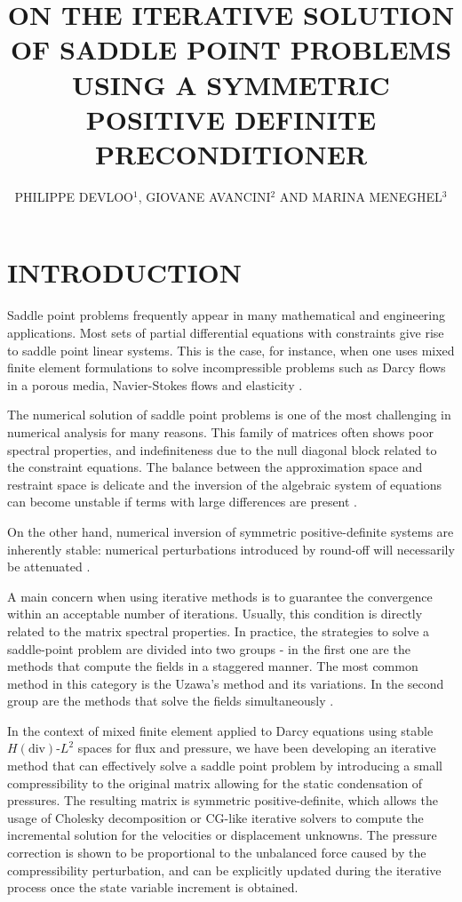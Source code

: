 \documentclass{wccm2024}
\title{ON THE ITERATIVE SOLUTION OF SADDLE POINT PROBLEMS USING A SYMMETRIC POSITIVE DEFINITE PRECONDITIONER}
\author{PHILIPPE DEVLOO$^{1}$, GIOVANE AVANCINI$^{2}$ AND MARINA MENEGHEL$^{3}$}
\begin{document}
\thispagestyle{empty}

\section{INTRODUCTION}

Saddle point problems frequently appear in many mathematical and engineering applications. Most sets of partial differential equations with constraints give rise to saddle point linear systems. This is the case, for instance, when one uses mixed finite element formulations to solve incompressible problems such as Darcy flows in a porous media, Navier-Stokes flows and elasticity \cite{brezzi2012mixed,duran2019multiscale,brink1996some}.

The numerical solution of saddle point problems is one of the most challenging in numerical analysis for many reasons. This family of matrices often shows poor spectral properties, and indefiniteness due to the null diagonal block related to the constraint equations. The balance between the approximation space and restraint space is delicate and the inversion of the algebraic system of equations can become unstable if terms with large differences are present \cite{bank1989class}. 

On the other hand, numerical inversion of symmetric positive-definite systems are inherently stable: numerical perturbations introduced by round-off will necessarily be attenuated \cite{rohn1994positive}.

A main concern when using iterative methods is to guarantee the convergence within an acceptable number of iterations. Usually, this condition is directly related to the matrix spectral properties. In practice, the strategies to solve a saddle-point problem are divided into two groups - in the first one are the methods that compute the fields in a staggered manner. The most common method in this category is the Uzawa’s method \cite{uzawa1958iterative} and its variations. In the second group are the methods that solve the fields simultaneously \cite{benzi2005numerical}.

In the context of mixed finite element applied to Darcy equations using stable $H(\text{div})$-$L^2$ spaces for flux and pressure, we have been developing an iterative method that can effectively solve a saddle point problem by introducing a small compressibility to the original matrix allowing for the static condensation of pressures. The resulting matrix is symmetric positive-definite, which allows the usage of Cholesky decomposition or CG-like iterative solvers to compute the incremental solution for the velocities or displacement unknowns. The pressure correction is shown to be proportional to the unbalanced force caused by the compressibility perturbation, and can be explicitly updated during the iterative process once the state variable increment is obtained.
\end{document}
